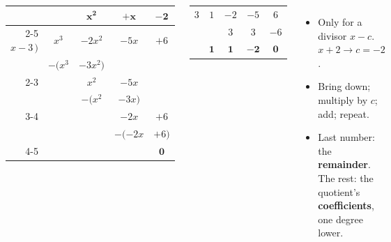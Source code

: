 \documentclass[aspectratio=169, 11pt]{beamer}
\begin{document}
\begin{frame}[t, plain]

  \begin{columns}[T]
      \begin{center}
      {\setlength{\tabcolsep}{2.5pt}\begin{tabular}{r@{\,}cccc}
                   &          & $\mathbf{x^2}$ & $\mathbf{+x}$ & $\mathbf{-2}$ \\ \cline{2-5}
       $x-3\,\big)$ & $x^3$    & $-2x^2$  & $-5x$    & $+6$   \\
                   & $-(x^3$  & $-3x^2)$ &          &        \\ \cline{2-3}
                   &          & $x^2$    & $-5x$    &        \\
                   &          & $-(x^2$  & $-3x)$   &        \\ \cline{3-4}
                   &          &          & $-2x$    & $+6$   \\
                   &          &          & $-(-2x$  & $+6)$  \\ \cline{4-5}
                   &          &          &          & {\color{redacc}$\mathbf{0}$} \\
      \end{tabular}}
      \end{center}
      \begin{center}
      {\large\setlength{\tabcolsep}{6pt}\begin{tabular}{c|cccc}
        $3$ & $1$ & $-2$ & $-5$ & $6$ \\
            &     & $3$  & $3$  & $-6$ \\ \hline
            & $\mathbf{1}$ & $\mathbf{1}$ & $\mathbf{-2}$ & {\color{redacc}$\mathbf{0}$} \\
      \end{tabular}}
      \end{center}

      \medskip
      \begin{itemize}\setlength{\itemsep}{4pt}
        \item Only for a divisor $x - c$. \quad $x + 2 \to c = -2$.
        \item Bring down; multiply by $c$; add; repeat.
        \item Last number: the \textbf{remainder}. The rest: the quotient's
              \textbf{coefficients}, one degree lower.
      \end{itemize}
  \end{columns}
\end{frame}
\end{document}
